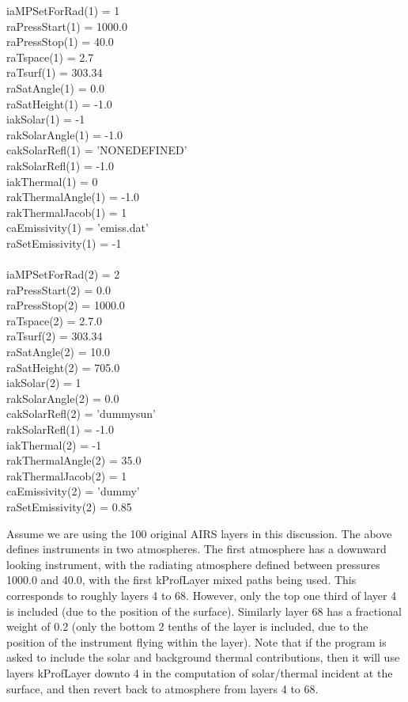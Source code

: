 \documentclass[12pt]{article}
\newcommand{\ttab}{\indent\indent}
\begin{document}
{\medskip
\ttab iaMPSetForRad(1)   = 1\\
\ttab raPressStart(1)    = 1000.0\\
\ttab raPressStop(1)     = 40.0\\
\ttab raTspace(1)        = 2.7\\
\ttab raTsurf(1)         = 303.34\\
\ttab raSatAngle(1)      = 0.0\\
\ttab raSatHeight(1)     = -1.0\\
\ttab iakSolar(1)        = -1\\
\ttab rakSolarAngle(1)   = -1.0\\
\ttab cakSolarRefl(1)    = 'NONEDEFINED'\\
\ttab rakSolarRefl(1)   = -1.0\\
\ttab iakThermal(1)      = 0\\
\ttab rakThermalAngle(1) = -1.0\\
\ttab rakThermalJacob(1) = 1\\
\ttab caEmissivity(1)    = 'emiss.dat'\\
\ttab raSetEmissivity(1) = -1\\
\ttab  \\
\ttab iaMPSetForRad(2)   = 2\\
\ttab raPressStart(2)    = 0.0\\
\ttab raPressStop(2)     = 1000.0\\
\ttab raTspace(2)        = 2.7.0\\
\ttab raTsurf(2)         = 303.34\\
\ttab raSatAngle(2)      = 10.0\\
\ttab raSatHeight(2)     = 705.0\\
\ttab iakSolar(2)        = 1\\
\ttab rakSolarAngle(2)   = 0.0\\
\ttab cakSolarRefl(2)    = 'dummysun'\\
\ttab rakSolarRefl(1)   = -1.0\\
\ttab iakThermal(2)      = -1\\
\ttab rakThermalAngle(2) = 35.0\\
\ttab rakThermalJacob(2) = 1\\
\ttab caEmissivity(2)    = 'dummy'\\
\ttab raSetEmissivity(2) = 0.85\\
\medskip

\noindent
Assume we are using the 100 original AIRS layers in this discussion. 
The above defines instruments in two atmospheres.  The first atmosphere has a
downward looking instrument, with the radiating atmosphere defined
between pressures 1000.0 and 40.0, with the first kProfLayer mixed paths
being used.  This corresponds to roughly layers 4 to 68.  However,
only the top one third of layer 4 is included (due to the position
of the surface).  Similarly layer 68 has a fractional weight of 0.2
(only the bottom 2 tenths of the layer is included, due to the
position of the instrument flying within the layer).  Note that if
the program is asked to include the solar and background thermal
contributions, then it will use layers kProfLayer downto 4 in the
computation of solar/thermal incident at the surface, and then
revert back to atmosphere from layers 4 to 68.

}
\end{document}
